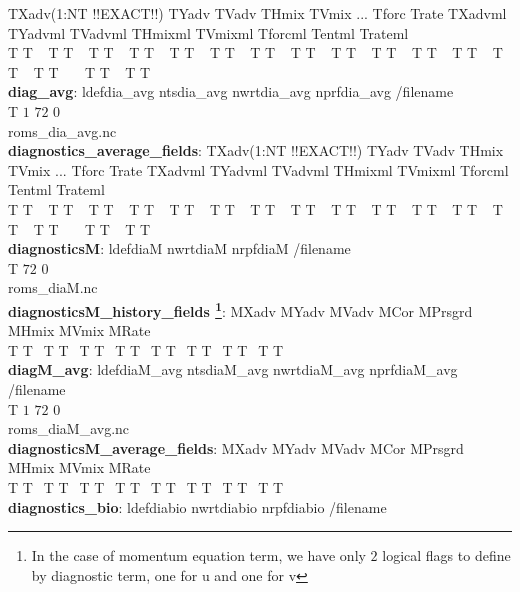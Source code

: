 TXadv(1:NT !!EXACT!!) TYadv TVadv THmix TVmix ... Tforc Trate TXadvml TYadvml TVadvml
THmixml TVmixml Tforcml Tentml
Trateml \\
\noindent  T T $~~$      T T $~~$    T T  $~~$    T T  $~~$    T T $~~$      T T $~~$       T T $~~$
 T T  $~~$    T T $~~$      T T  $~~$       T T  $~~$      T T  $~~$  T T $~~$  T T $~~$
 $~~$ T T $~~$   T T $~~$ \\
\textbf{diag\_avg}: ldefdia\_avg  ntsdia\_avg  nwrtdia\_avg  nprfdia\_avg /filename \\
               T          $1 $          $72$            0 \\
                                 roms\_dia\_avg.nc \\
\textbf{diagnostics\_average\_fields}:   TXadv(1:NT !!EXACT!!) TYadv  TVadv  THmix 
TVmix ... Tforc  Trate  TXadvml  TYadvml   TVadvml  THmixml TVmixml Tforcml Tentml
Trateml \\
\noindent  T T $~~$      T T $~~$    T T  $~~$    T T  $~~$    T T $~~$      T T $~~$       T T $~~$
 T T  $~~$    T T $~~$      T T  $~~$       T T  $~~$      T T  $~~$  T T $~~$  T T $~~$
 $~~$ T T $~~$   T T $~~$ \\
\textbf{diagnosticsM}:   ldefdiaM   nwrtdiaM    nrpfdiaM /filename \\
                   T          $72$          $0$ \\
                                 roms\_diaM.nc \\
\textbf{diagnosticsM\_history\_fields \footnote{In the case of momentum equation term,
  we have only $2$ logical flags to define by diagnostic term, one for u and one for v}}:   MXadv MYadv MVadv MCor MPrsgrd MHmix MVmix MRate \\
\noindent  T T$~~$   T T$~~$    T T$~~$ T T$~~$ T T$~~$ T T$~~$ T T$~~$ T T$~~$  \\
\textbf{diagM\_avg}: ldefdiaM\_avg  ntsdiaM\_avg  nwrtdiaM\_avg  nprfdiaM\_avg /filename \\
               T          $1$           $72$            $0$ \\
                                 roms\_diaM\_avg.nc \\
\textbf{diagnosticsM\_average\_fields}:   MXadv MYadv MVadv MCor MPrsgrd MHmix MVmix
MRate \\
\noindent  T T$~~$   T T$~~$    T T$~~$ T T$~~$ T T$~~$ T T$~~$ T T$~~$ T T$~~$  \\
\textbf{diagnostics\_bio}:   ldefdiabio   nwrtdiabio    nrpfdiabio /filename \\
